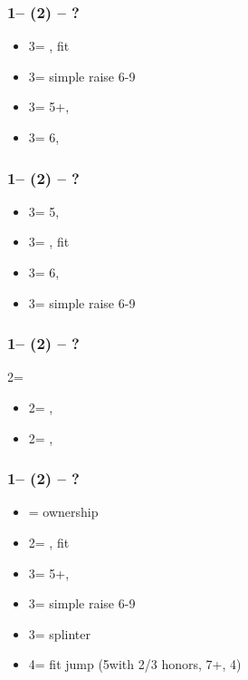 \subsubsection*{1\diams -- (2\nt) -- ?}
\begin{itemize}
    \item 3\clubs = \invp, fit
    \item 3\diams = simple raise 6-9
    \item 3\hearts = 5+\spades, \gf
    \item 3\spades = 6\spades, \nf \imp
\end{itemize}

\subsubsection*{1\spades -- (2\nt) -- ?}
\begin{itemize}
    \item 3\clubs = 5\hearts, \gf
    \item 3\diams = \invp, fit
    \item 3\hearts = 6\hearts, \nf \imp
    \item 3\spades = simple raise 6-9
\end{itemize}

\subsubsection*{1\clubs -- (2\diams) -- ?}
2\diams = \major
\begin{itemize}
    \item 2\hearts = \clubs, \invp
    \item 2\spades = \diams, \gf
\end{itemize}

\subsubsection*{1\hearts -- (2\hearts) -- ?}
\begin{itemize}
    \item \dbl = ownership
    \item 2\spades = \invp, fit
    \item 3\minor = 5+, \gf
    \item 3\hearts = simple raise 6-9
    \item 3\spades = splinter
    \item 4\minor = fit jump (5\minor with 2/3 honors, 7+, 4\hearts)
\end{itemize}

